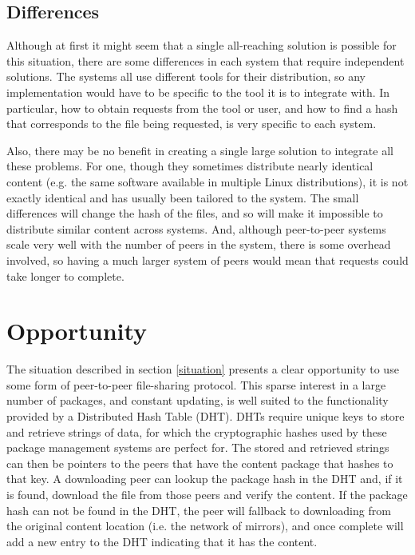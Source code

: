 \documentclass[conference]{IEEEtran}
\begin{document}
\subsection{Differences}
\label{differences}

Although at first it might seem that a single all-reaching solution
is possible for this situation, there are some differences in each
system that require independent solutions. The systems all use
different tools for their distribution, so any implementation would
have to be specific to the tool it is to integrate with. In
particular, how to obtain requests from the tool or user, and how to
find a hash that corresponds to the file being requested, is very
specific to each system.

Also, there may be no benefit in creating a single large solution to
integrate all these problems. For one, though they sometimes
distribute nearly identical content (e.g. the same software
available in multiple Linux distributions), it is not exactly
identical and has usually been tailored to the system. The small
differences will change the hash of the files, and so
will make it impossible to distribute similar content
across systems. And, although peer-to-peer systems scale very well
with the number of peers in the system, there is some overhead
involved, so having a much larger system of peers would mean that
requests could take longer to complete.


\section{Opportunity}
\label{opportunity}

The situation described in section \ref{situation} presents a clear
opportunity to use some form of peer-to-peer file-sharing protocol.
This sparse interest in a large number of packages, and constant
updating, is well suited to the functionality provided by a
Distributed Hash Table (DHT). DHTs require unique keys to store and
retrieve strings of data, for which the cryptographic hashes used by
these package management systems are perfect for. The stored and
retrieved strings can then be pointers to the peers that have the
content package that hashes to that key. A downloading peer can
lookup the package hash in the DHT and, if it is found,
download the file from those peers and verify the content. If the
package hash can not be found in the DHT, the peer will fallback to
downloading from the original content location (i.e. the network of
mirrors), and once complete will add a new entry to the DHT
indicating that it has the content.
\end{document}
